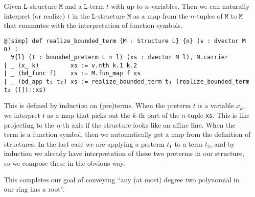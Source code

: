 \begin{dfn}
    Given $\texttt{L}$-structure $\texttt{M}$ and a $\texttt{L}$-term $t$ with up to $n$-variables.
    Then we can naturally interpret (or realize) $t$ in the $\texttt{L}$-structure $\texttt{M}$ as a
    map from the $n$-tuples of $\texttt{M}$ to $\texttt{M}$ that
    commutes with the interpretation of function symbols.

    \begin{lstlisting}
@[simp] def realize_bounded_term {M : Structure L} {n} (v : dvector M n) :
  ∀{l} (t : bounded_preterm L n l) (xs : dvector M l), M.carrier
| _ (x_ k)         xs := v.nth k.1 k.2
| _ (bd_func f)    xs := M.fun_map f xs
| _ (bd_app t₁ t₂) xs := realize_bounded_term t₁ (realize_bounded_term t₂ ([])::xs) \end{lstlisting}

    This is defined by induction on (pre)terms.
    When the preterm $t$ is a variable $x_{k}$, we interpret $t$ as a map
    that picks out the $k$-th part of the $n$-tuple \texttt{xs}.
    This is like projecting to the $n$-th axis if the structure looks like an affine line.
    When the term is a function symbol, then we automatically get a map from the
    definition of structures.
    In the last case we are applying a preterm $t_{1}$ to a term $t_{2}$,
    and by induction we already have interpretation of these two preterms
    in our structure, so we compose these in the obvious way.
\end{dfn}

This completes our goal of conveying
``any (at most) degree two polynomial in our ring has a root''.

